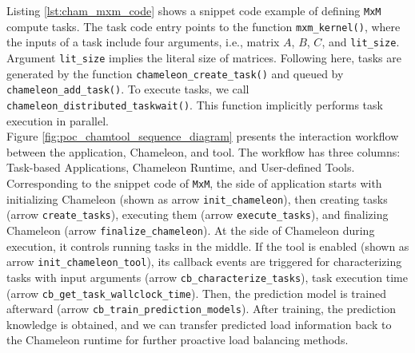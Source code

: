 Listing \ref{lst:cham_mxm_code} shows a snippet code example of defining \texttt{MxM} compute tasks. The task code entry points to the function \texttt{mxm\_kernel()}, where the inputs of a task include four arguments, i.e., matrix $A$, $B$, $C$, and \texttt{lit\_size}. Argument \texttt{lit\_size} implies the literal size of matrices. Following here, tasks are generated by the function \texttt{chameleon\_create\_task()} and queued by \texttt{chameleon\_add\_task()}. To execute tasks, we call \texttt{chameleon\_distributed\_taskwait()}. This function implicitly performs task execution in parallel.\\

Figure \ref{fig:poc_chamtool_sequence_diagram} presents the interaction workflow between the application, Chameleon, and tool. The workflow has three columns: Task-based Applications, Chameleon Runtime, and User-defined Tools. Corresponding to the snippet code of \texttt{MxM}, the side of application starts with initializing Chameleon (shown as arrow \texttt{init\_chameleon}), then creating tasks (arrow \texttt{create\_tasks}), executing them (arrow \texttt{execute\_tasks}), and finalizing Chameleon (arrow \texttt{finalize\_chameleon}). At the side of Chameleon during execution, it controls running tasks in the middle. If the tool is enabled (shown as arrow \texttt{init\_chameleon\_tool}), its callback events are triggered for characterizing tasks with input arguments (arrow \texttt{cb\_characterize\_tasks}), task execution time (arrow \texttt{cb\_get\_task\_wallclock\_time}). Then, the prediction model is trained afterward (arrow \texttt{cb\_train\_prediction\_models}). After training, the prediction knowledge is obtained, and we can transfer predicted load information back to the Chameleon runtime for further proactive load balancing methods.


